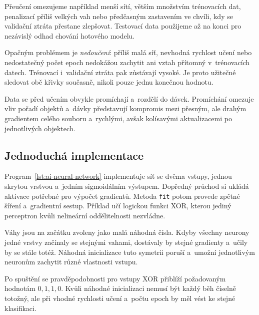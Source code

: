 Přeučení omezujeme například menší sítí, větším množstvím trénovacích dat, penalizací příliš velkých vah nebo předčasným zastavením ve chvíli, kdy se validační ztráta přestane zlepšovat. Testovací data použijeme až na konci pro nezávislý odhad chování hotového modelu.

Opačným problémem je \emph{nedoučení}: příliš malá síť, nevhodná rychlost učení nebo nedostatečný počet epoch nedokážou zachytit ani vztah přítomný v~trénovacích datech. Trénovací i~validační ztráta pak zůstávají vysoké. Je proto užitečné sledovat obě křivky současně, nikoli pouze jednu konečnou hodnotu.

Data se před učením obvykle promíchají a~rozdělí do dávek. Promíchání omezuje vliv pořadí objektů a~dávky představují kompromis mezi přesným, ale drahým gradientem celého souboru a~rychlými, avšak kolísavými aktualizacemi po jednotlivých objektech.

\newpage
\subsection{Jednoduchá implementace}

Program~\ref{lst:ai-neural-network} implementuje síť se dvěma vstupy, jednou skrytou vrstvou a~jedním sigmoidálním výstupem. Dopředný průchod si ukládá aktivace potřebné pro výpočet gradientů. Metoda \texttt{fit} potom provede zpětné šíření a~gradientní sestup. Příklad učí logickou funkci XOR, kterou jediný perceptron kvůli nelineární oddělitelnosti nezvládne.

Váhy jsou na začátku zvoleny jako malá náhodná čísla. Kdyby všechny neurony jedné vrstvy začínaly se stejnými vahami, dostávaly by stejné gradienty a~učily by se stále totéž. Náhodná inicializace tuto symetrii poruší a~umožní jednotlivým neuronům zachytit různé vlastnosti vstupu.




Po spuštění se pravděpodobnosti pro vstupy XOR přiblíží požadovaným hodnotám \(0,1,1,0\). Kvůli náhodné inicializaci nemusí být každý běh číselně totožný, ale při vhodné rychlosti učení a~počtu epoch by měl vést ke stejné klasifikaci.
